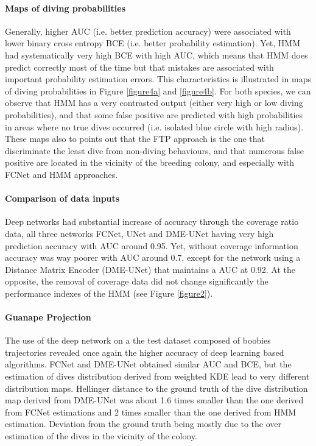 \documentclass{article}
\begin{document}
\paragraph{Maps of diving probabilities}
Generally, higher AUC (i.e. better prediction accuracy) were associated with lower binary cross entropy BCE (i.e. better probability estimation).
Yet, HMM had systematically very high BCE with high AUC, which means that HMM does predict correctly most of the time but that mistakes are associated with important probability estimation errors.
This characteristics is illustrated in maps of diving probabilities in Figure \ref{figure4a} and \ref{figure4b}. For both species, we can observe that HMM has a very contrasted output (either very high or low diving probabilities), and that some false positive are predicted with high probabilities in areas where no true dives occurred (i.e. isolated blue circle with high radius).
These maps also to points out that the FTP approach is the one that discriminate the least dive from non-diving behaviours, and that numerous false positive are located in the vicinity of the breeding colony, and especially with FCNet and HMM approaches.

\paragraph{Comparison of data inputs}
Deep networks had substantial increase of accuracy through the coverage ratio data, all three networks FCNet, UNet and DME-UNet having very high prediction accuracy with AUC around 0.95.
Yet, without coverage information accuracy was way poorer with AUC around 0.7, except for the network using a Distance Matrix Encoder (DME-UNet) that maintains a AUC at 0.92.
At the opposite, the removal of coverage data did not change significantly the performance indexes of the HMM (see Figure \ref{figure2}).

\paragraph{Guanape Projection}
The use of the deep network on a the test dataset composed of boobies trajectories revealed once again the higher accuracy of deep learning based algorithms. FCNet and DME-UNet obtained similar AUC and BCE, but the estimation of dives distribution derived from weighted KDE lead to very different distribution maps. Hellinger distance to the ground truth of the dive distribution map derived from DME-UNet was about 1.6 times smaller than the one derived from FCNet estimations and 2 times smaller than the one derived from HMM estimation. Deviation from the ground truth being mostly due to the over estimation of the dives in the vicinity of the colony.
\end{document}
